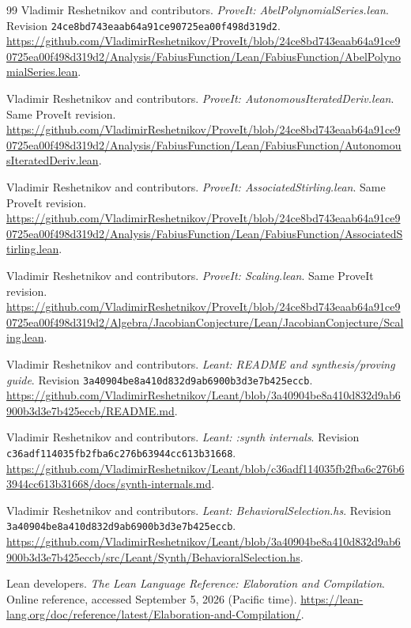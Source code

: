 \documentclass[11pt,a4paper]{article}
\theoremstyle{remark}
\begin{document}
\clearpage
\begin{thebibliography}{99}
\small
{}
Vladimir Reshetnikov and contributors.
\emph{ProveIt: AbelPolynomialSeries.lean}.
Revision \texttt{24ce8bd743eaab64a91ce90725ea00f498d319d2}.
\url{https://github.com/VladimirReshetnikov/ProveIt/blob/24ce8bd743eaab64a91ce90725ea00f498d319d2/Analysis/FabiusFunction/Lean/FabiusFunction/AbelPolynomialSeries.lean}.

Vladimir Reshetnikov and contributors.
\emph{ProveIt: AutonomousIteratedDeriv.lean}.
Same ProveIt revision.
\url{https://github.com/VladimirReshetnikov/ProveIt/blob/24ce8bd743eaab64a91ce90725ea00f498d319d2/Analysis/FabiusFunction/Lean/FabiusFunction/AutonomousIteratedDeriv.lean}.

Vladimir Reshetnikov and contributors.
\emph{ProveIt: AssociatedStirling.lean}.
Same ProveIt revision.
\url{https://github.com/VladimirReshetnikov/ProveIt/blob/24ce8bd743eaab64a91ce90725ea00f498d319d2/Analysis/FabiusFunction/Lean/FabiusFunction/AssociatedStirling.lean}.

Vladimir Reshetnikov and contributors.
\emph{ProveIt: Scaling.lean}.
Same ProveIt revision.
\url{https://github.com/VladimirReshetnikov/ProveIt/blob/24ce8bd743eaab64a91ce90725ea00f498d319d2/Algebra/JacobianConjecture/Lean/JacobianConjecture/Scaling.lean}.

Vladimir Reshetnikov and contributors.
\emph{Leant: README and synthesis/proving guide}.
Revision \texttt{3a40904be8a410d832d9ab6900b3d3e7b425eccb}.
\url{https://github.com/VladimirReshetnikov/Leant/blob/3a40904be8a410d832d9ab6900b3d3e7b425eccb/README.md}.

Vladimir Reshetnikov and contributors.
\emph{Leant: :synth internals}.
Revision \texttt{c36adf114035fb2fba6c276b63944cc613b31668}.
\url{https://github.com/VladimirReshetnikov/Leant/blob/c36adf114035fb2fba6c276b63944cc613b31668/docs/synth-internals.md}.

Vladimir Reshetnikov and contributors.
\emph{Leant: BehavioralSelection.hs}.
Revision \texttt{3a40904be8a410d832d9ab6900b3d3e7b425eccb}.
\url{https://github.com/VladimirReshetnikov/Leant/blob/3a40904be8a410d832d9ab6900b3d3e7b425eccb/src/Leant/Synth/BehavioralSelection.hs}.

Lean developers.
\emph{The Lean Language Reference: Elaboration and Compilation}.
Online reference, accessed September 5, 2026 (Pacific time).
\url{https://lean-lang.org/doc/reference/latest/Elaboration-and-Compilation/}.


\end{thebibliography}
\end{document}
